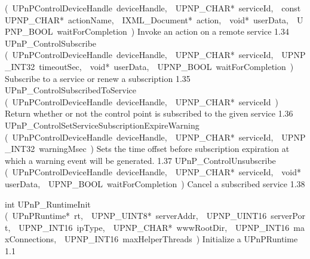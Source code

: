 \documentclass{article}
\begin{document}
\begin{cxxentry}
\begin{cxxnames}
        {(\ UPnPControlDeviceHandle\ deviceHandle,\ \ UPNP\_CHAR*\ serviceId,\ \ const\ UPNP\_CHAR*\ actionName,\ \ IXML\_Document*\ action,\ \ void*\ userData,\ \ UPNP\_BOOL\ waitForCompletion\ )}
        {Invoke an action on a remote service }
        {1.34}
        {UPnP\_ControlSubscribe}
        {(\ UPnPControlDeviceHandle\ deviceHandle,\ \ UPNP\_CHAR*\ serviceId,\ \ UPNP\_INT32\ timeoutSec,\ \ void*\ userData,\ \ UPNP\_BOOL\ waitForCompletion\ )}
        {Subscribe to a service or renew a subscription }
        {1.35}
        {UPnP\_ControlSubscribedToService}
        {(\ UPnPControlDeviceHandle\ deviceHandle,\ \ UPNP\_CHAR*\ serviceId\ )}
        {Return whether or not the control point is subscribed to the given service }
        {1.36}
        {UPnP\_ControlSetServiceSubscriptionExpireWarning}
        {(\ UPnPControlDeviceHandle\ deviceHandle,\ \ UPNP\_CHAR*\ serviceId,\ \ UPNP\_INT32\ warningMsec\ )}
        {Sets the time offset before subscription expiration at which a warning event will be generated. }
        {1.37}
        {UPnP\_ControlUnsubscribe}
        {(\ UPnPControlDeviceHandle\ deviceHandle,\ \ UPNP\_CHAR*\ serviceId,\ \ void*\ userData,\ \ UPNP\_BOOL\ waitForCompletion\ )}
        {Cancel a subscribed service }
        {1.38}
\end{cxxnames}
\begin{cxxfunction}
{int}
        {UPnP\_RuntimeInit}
        {(\ UPnPRuntime*\ rt,\ \ UPNP\_UINT8*\ serverAddr,\ \ UPNP\_UINT16\ serverPort,\ \ UPNP\_INT16\ ipType,\ \ UPNP\_CHAR*\ wwwRootDir,\ \ UPNP\_INT16\ maxConnections,\ \ UPNP\_INT16\ maxHelperThreads\ )}
        {Initialize a UPnPRuntime }
        {1.1}
\begin{cxxdoc}


\end{cxxdoc}
\end{cxxfunction}
\end{cxxentry}
\end{document}
